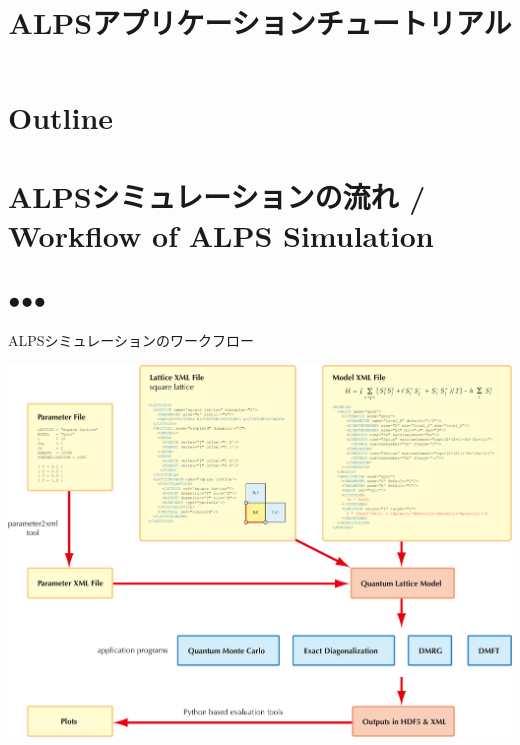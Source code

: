 
\title{ALPSアプリケーションチュートリアル}




\begin{frame}
  \titlepage
\end{frame}

\section*{Outline}
\begin{frame}[t,fragile]
   \tableofcontents
\end{frame}

\section{ALPSシミュレーションの流れ / Workflow of ALPS Simulation}
\subsection*{{\protect\color{red}●}{\protect\color{blue}●}{\protect\color{green}●}}

\begin{frame}{ALPSシミュレーションのワークフロー}
  \begin{center}
    \includegraphics[height=0.8\textheight]{workflow.pdf}
  \end{center}
\end{frame}

